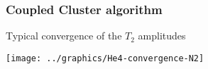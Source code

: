 \begin{frame}
\frametitle{Coupled Cluster algorithm}

Typical convergence of the $T_2$ amplitudes
\begin{center}
    \texttt{[image: ../graphics/He4-convergence-N2]}
\end{center}
\end{frame}

